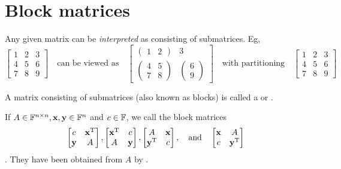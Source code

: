 \section{Block matrices}
Any given matrix can be \textit{interpreted} as consisting of submatrices. Eg,
\[ \begin{bmatrix}
1&2&3\\4&5&6\\7&8&9
\end{bmatrix} \quad \text{can be viewed as} \quad 
\begin{bmatrix}
\begin{pmatrix}
1 & 2
\end{pmatrix} & 3 \\
\begin{pmatrix}
4 & 5 \\ 7 & 8
\end{pmatrix} & \begin{pmatrix}
6 \\ 9
\end{pmatrix}
\end{bmatrix}
\quad \text{with partitioning} \quad
\left[\begin{array}{cc|c}
1&2&3\\ \hline
4&5&6\\7&8&9
\end{array}\right]
 \]
\begin{definition}
A matrix consisting of submatrices (also known as blocks) is called a  or .

If $A\in\mathbb{F}^{n\times n}, \boldsymbol{\mathrm{x}},\boldsymbol{\mathrm{y}}\in\mathbb{F}^n$ and $c\in \mathbb{F}$, we call the block matrices
\[ \begin{bmatrix}
c & \boldsymbol{\mathrm{x}}^{\mathrm{T}} \\ \boldsymbol{\mathrm{y}} & A
\end{bmatrix}, \begin{bmatrix}
\boldsymbol{\mathrm{x}}^{\mathrm{T}} & c \\ A & \boldsymbol{\mathrm{y}}
\end{bmatrix}, \begin{bmatrix}
A & \boldsymbol{\mathrm{x}} \\
\boldsymbol{\mathrm{y}}^{\mathrm{T}} & c
\end{bmatrix}, \quad\text{and}\quad \begin{bmatrix}
\boldsymbol{\mathrm{x}} & A \\ c & \boldsymbol{\mathrm{y}}^{\mathrm{T}}
\end{bmatrix} \]
. They have been obtained from $A$ by .
\end{definition}

